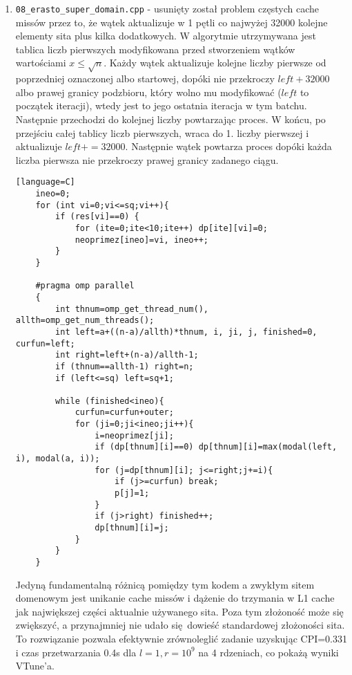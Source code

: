 \documentclass[12pt]{article}
\begin{document}
\begin {enumerate}
	\item \texttt{08\_erasto\_super\_domain.cpp} - usunięty został problem częstych cache missów przez to, że wątek aktualizuje w 1 pętli co najwyżej 32000 kolejne elementy sita plus kilka dodatkowych. W algorytmie utrzymywana jest tablica liczb pierwszych modyfikowana przed stworzeniem wątków wartościami \(x\le \sqrt{n}\). Każdy wątek aktualizuje kolejne liczby pierwsze od poprzedniej oznaczonej albo startowej, dopóki nie przekroczy \(left+32000\) albo prawej granicy podzbioru, który wolno mu modyfikować (\(left\) to początek iteracji), wtedy jest to jego ostatnia iteracja w tym batchu. Następnie przechodzi do kolejnej liczby powtarzając proces. W końcu, po przejściu całej tablicy liczb pierwszych, wraca do 1. liczby pierwszej i aktualizuje \(left+=32000\). Następnie wątek powtarza proces dopóki każda liczba pierwsza nie przekroczy prawej granicy zadanego ciągu.
	\begin{lstlisting}[style=mystyle, caption= Sito funkcyjne z dynamic schedulingiem][language=C]
	ineo=0;
	for (int vi=0;vi<=sq;vi++){
		if (res[vi]==0) {
			for (ite=0;ite<10;ite++) dp[ite][vi]=0;
			neoprimez[ineo]=vi, ineo++;
		}
	}
	
	#pragma omp parallel
	{
		int thnum=omp_get_thread_num(), allth=omp_get_num_threads();
		int left=a+((n-a)/allth)*thnum, i, ji, j, finished=0, curfun=left;
		int right=left+(n-a)/allth-1;
		if (thnum==allth-1) right=n;
		if (left<=sq) left=sq+1;
		
		while (finished<ineo){
			curfun=curfun+outer;
			for (ji=0;ji<ineo;ji++){
				i=neoprimez[ji];
				if (dp[thnum][i]==0) dp[thnum][i]=max(modal(left, i), modal(a, i));
				for (j=dp[thnum][i]; j<=right;j+=i){
					if (j>=curfun) break;
					p[j]=1;	
				}
				if (j>right) finished++;
				dp[thnum][i]=j;
			}
		}
	}
\end{lstlisting}
Jedyną fundamentalną różnicą pomiędzy tym kodem a zwykłym sitem domenowym jest unikanie cache missów i dążenie do trzymania w L1 cache jak największej części aktualnie używanego sita. Poza tym złożoność może się zwiększyć, a przynajmniej nie udało się dowieść standardowej złożoności sita. To rozwiązanie pozwala efektywnie zrównoleglić zadanie uzyskując CPI=0.331 i czas przetwarzania 0.4s dla \(l=1, r=10^9\) na 4 rdzeniach, co pokażą wyniki VTune'a.


\end{enumerate}
\end{document}
